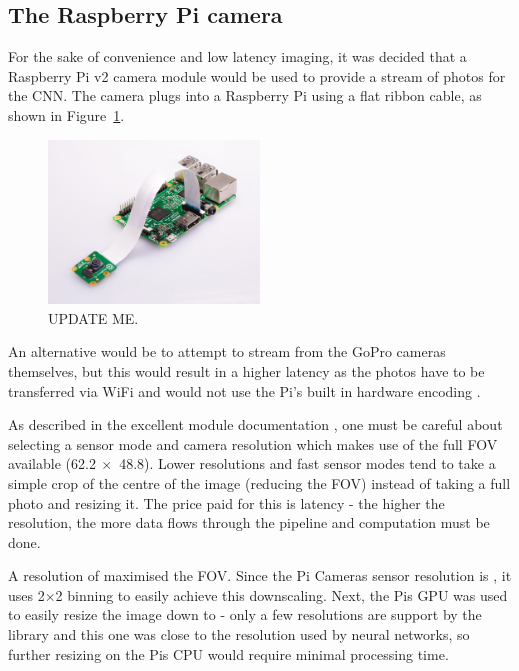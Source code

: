 \subsection{The Raspberry Pi camera}
For the sake of convenience and low latency imaging, it was decided that a Raspberry Pi v2 camera module would be used to provide a stream of photos for the CNN. The camera plugs into a Raspberry Pi using a flat ribbon cable, as shown in Figure~\ref{fig:r_pi_camera}.

\begin{figure}[h!]
  \centering
  \includegraphics[width=0.5\textwidth]{methodology/r_pi_camera}
  \caption{\label{fig:r_pi_camera} UPDATE ME.}
\end{figure}

An alternative would be to attempt to stream from the GoPro cameras themselves, but this would result in a higher latency as the photos have to be transferred via WiFi and would not use the Pi's built in hardware encoding \cite{website:gopro_to_rpi, website:gopro_to_rpi2}.

As described in the excellent  module documentation \cite{website:picamera_hardware}, one must be careful about selecting a sensor mode and camera resolution which makes use of the full FOV available (62.2\textdegree $\ \times$ 48.8\textdegree). Lower resolutions and fast sensor modes tend to take a simple crop of the centre of the image (reducing the FOV) instead of taking a full photo and resizing it. The price paid for this is latency - the higher the resolution, the more data flows through the pipeline and computation must be done.

A resolution of  maximised the FOV. Since the Pi Cameras sensor resolution is , it uses 2$\times$2 binning to easily achieve this downscaling. Next, the Pis GPU was used to easily resize the image down to  - only a few resolutions are support by the library and this one was close to the resolution used by neural networks, so further resizing on the Pis CPU would require minimal processing time.

